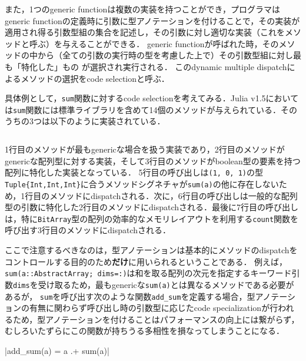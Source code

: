 また，1つのgeneric functionは複数の実装を持つことができ，プログラマはgeneric functionの定義時に引数に型アノテーションを付けることで，その実装が適用され得る引数型組の集合を記述し，その引数に対し適切な実装（これをメソッドと呼ぶ）を与えることができる．
generic functionが呼ばれた時，そのメソッドの中から（全ての引数の実行時の型を考慮した上で）その引数型組に対し最も「特化した」もの\footnotemark
が選択され実行される．
このdynamic multiple dispatchによるメソッドの選択をcode selectionと呼ぶ．


具体例として，\texttt{sum}関数に対するcode selectionを考えてみる．Julia v1.5においては\texttt{sum}関数には標準ライブラリを含めて14個のメソッドが与えられている．そのうちの3つは以下のように実装されている．

\inputminted[frame=lines, linenos]{julia}{src/sums_method.jl}

1行目のメソッドが最もgenericな場合を扱う実装であり，2行目のメソッドがgenericな配列型に対する実装，そして3行目のメソッドがboolean型の要素を持つ配列に特化した実装となっている．
5行目の呼び出しは\texttt{(1, 0, 1)}の型\texttt{Tuple\{Int,Int,Int\}}に合うメソッドシグネチャが\texttt{sum(a)}の他に存在しないため，1行目のメソッドにdispatchされる．次に，6行目の呼び出しは一般的な配列型の引数に特化した2行目のメソッドにdispatchされる．最後に7行目の呼び出しは，特に\texttt{BitArray}型の配列の効率的なメモリレイアウトを利用する\texttt{count}関数を呼び出す3行目のメソッドにdispatchされる．

ここで注意するべきなのは，型アノテーションは基本的にメソッドのdispatchをコントロールする目的のため\textbf{だけ}に用いられるということである．
例えば，\texttt{sum(a::AbstractArray; dims=:)}は和を取る配列の次元を指定するキーワード引数\texttt{dims}を受け取るため，最もgenericな\texttt{sum(a)}とは異なるメソッドである必要があるが\footnotemark[1]，
\texttt{sum}を呼び出す次のような関数\texttt{add\_sum}を定義する場合，型アノテーションの有無に関わらず呼び出し時の引数型に応じたcode specializationが行われるため，型アノテーションを付けることはパフォーマンスの向上には繋がらず，むしろいたずらにこの関数が持ちうる多相性を損なってしまうことになる．\footnotemark[2]

|add_sum(a) = a .+ sum(a)|


